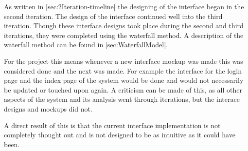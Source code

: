 As written in \cref{sec:2Iteration-timeline} the designing of the interface began in the second iteration.
The design of the interface continued well into the third iteration.
Though these interface designs took place during the second and third iterations, they were completed using the waterfall method.
A description of the waterfall method can be found in \cref{sec:WaterfallModel}.

For the project this means whenever a new interface mockup was made this was considered done and the next was made.
For example the interface for the login page and the index page of the system would be done and would not necessarily be updated or touched upon again.
A criticism can be made of this, as all other aspects of the system and its analysis went through iterations, but the interace designs and mockups did not.

A direct result of this is that the current interface implementation is not completely thought out and is not designed to be as intuitive as it could have been.
